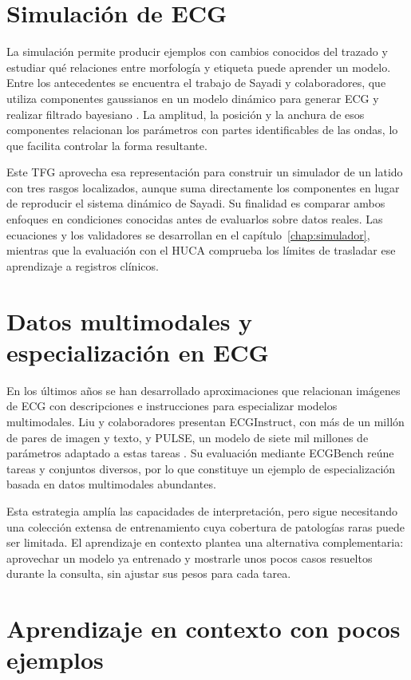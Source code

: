 \section{Simulación de ECG}

La simulación permite producir ejemplos con cambios conocidos del trazado y estudiar qué relaciones entre morfología y etiqueta puede aprender un modelo. Entre los antecedentes se encuentra el trabajo de Sayadi y colaboradores, que utiliza componentes gaussianos en un modelo dinámico para generar ECG y realizar filtrado bayesiano \cite{sayadi2010}. La amplitud, la posición y la anchura de esos componentes relacionan los parámetros con partes identificables de las ondas, lo que facilita controlar la forma resultante.

Este TFG aprovecha esa representación para construir un simulador de un latido con tres rasgos localizados, aunque suma directamente los componentes en lugar de reproducir el sistema dinámico de Sayadi. Su finalidad es comparar ambos enfoques en condiciones conocidas antes de evaluarlos sobre datos reales. Las ecuaciones y los validadores se desarrollan en el capítulo~\ref{chap:simulador}, mientras que la evaluación con el HUCA comprueba los límites de trasladar ese aprendizaje a registros clínicos.

\section{Datos multimodales y especialización en ECG}

En los últimos años se han desarrollado aproximaciones que relacionan imágenes de ECG con descripciones e instrucciones para especializar modelos multimodales. Liu y colaboradores presentan ECGInstruct, con más de un millón de pares de imagen y texto, y PULSE, un modelo de siete mil millones de parámetros adaptado a estas tareas \cite{liu2026}. Su evaluación mediante ECGBench reúne tareas y conjuntos diversos, por lo que constituye un ejemplo de especialización basada en datos multimodales abundantes.

Esta estrategia amplía las capacidades de interpretación, pero sigue necesitando una colección extensa de entrenamiento cuya cobertura de patologías raras puede ser limitada. El aprendizaje en contexto plantea una alternativa complementaria: aprovechar un modelo ya entrenado y mostrarle unos pocos casos resueltos durante la consulta, sin ajustar sus pesos para cada tarea.

\section{Aprendizaje en contexto con pocos ejemplos}
\label{sec:antecedentes_icl}

